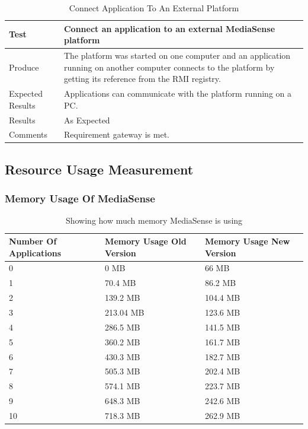 \begin{table}[!h]
    \begin{tabular}{ | l | p{12cm} |}
    \hline
    Test 	 				& 		 Connect an application to an external MediaSense platform\\ \hline
	Produce  				& 		 The platform was started on one computer and an application running on another computer connects to the platform by getting its reference from the RMI registry.\\ \hline
	Expected Results  		& 		 Applications can communicate with the platform running on a PC. \\ \hline
	Results 				& 		 As Expected\\ \hline
	Comments				& 		 Requirement gateway is met. \\ \hline
    \end{tabular}
    \caption{Connect Application To An External Platform}
\end{table}
\clearpage


\subsection{Resource Usage Measurement}

\subsubsection{Memory Usage Of MediaSense}
\begin{table}[H]
\begin{center}
    \begin{tabular}[t!]{ | l | l | l |}
    \hline
    Number Of Applications								& Memory Usage Old Version				& Memory Usage New Version\\ \hline
    0 													& 0 MB									& 66 MB\\ \hline
    1 													& 70.4 MB								& 86.2 MB\\ \hline
    2 													& 139.2 MB								& 104.4 MB\\ \hline
    3 													& 213.04 MB								& 123.6 MB\\ \hline
    4 													& 286.5 MB								& 141.5 MB\\ \hline
    5 													& 360.2 MB								& 161.7 MB\\ \hline
    6 													& 430.3 MB								& 182.7 MB\\ \hline
    7 													& 505.3 MB								& 202.4 MB\\ \hline
    8 													& 574.1 MB								& 223.7 MB\\ \hline
    9 													& 648.3 MB								& 242.6 MB\\ \hline
    10 													& 718.3 MB								& 262.9 MB\\ \hline
    \end{tabular}
    \caption{Showing how much memory MediaSense is using}
\end{center}
\end{table}


